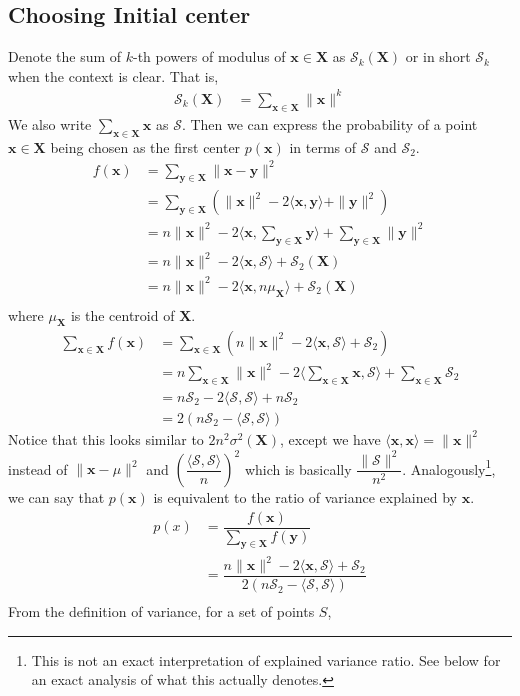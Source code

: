 \documentclass[twoside, 11pt]{article}
\newcommand{\x}{\mathbf{x}}
\newcommand{\X}{\mathbf{X}}
\newcommand{\y}{\mathbf{y}}
\renewcommand{\S}{\mathcal{S}}
\begin{document}
	\subsection{Choosing Initial center}
	Denote the sum of $k$-th powers of modulus of $\x\in\X$ as $\S_k(\X)$ or in short $\S_k$ when the context is clear. That is,
		\begin{align*}
			\S_k(\X) & = \sum_{\x\in\X}\|\x\|^k
		\end{align*}
	We also write $\sum_{\x\in\X}\x$ as $\S$. Then we can express the probability of a point $\x\in\X$ being chosen as the first center $p(\x)$ in terms of $\S$ and $\S_2$.
		\begin{align*}
			f(\x)	& = \sum_{\y\in\X}\|\x-\y\|^2\\
					& = \sum_{\y\in\X}\left(\|\x\|^2-2\langle\x,\y\rangle+\|\y\|^2\right)\\
					& = n\|\x\|^2-2\langle\x,\sum_{\y\in\X}\y\rangle+\sum_{\y\in\X}\|\y\|^2\\
					& = n\|\x\|^2-2\langle\x,\S\rangle+\S_2(\X)\\
					& = n\|\x\|^2-2\langle\x,n\mu_{\X}\rangle+\S_2(\X)\\
		\end{align*}
	where $\mu_{\X}$ is the centroid of $\X$.
		\begin{align*}
			\sum_{\x\in\X}f(\x)
					& = \sum_{\x\in\X}\left(n\|\x\|^2-2\langle\x,\S\rangle+\S_2\right)\\
					& = n\sum_{\x\in\X}\|\x\|^2-2\langle\sum_{\x\in\X}\x,\S\rangle+\sum_{\x\in\X}\S_2\\
					& = n\S_2-2\langle\S,\S\rangle+n\S_2\\
					& = 2(n\S_2-\langle\S,\S\rangle)
		\end{align*}
	Notice that this looks similar to $2n^2\sigma^2(\X)$, except we have $\langle \x,\x\rangle=\|\x\|^2$ instead of $\|\x-\mu\|^2$ and $\left(\dfrac{\langle\S,\S\rangle}{n}\right)^2$ which is basically $\dfrac{\|\S\|^2}{n^2}$. Analogously\footnote{This is not an exact interpretation of explained variance ratio. See below for an exact analysis of what this actually denotes.}, we can say that $p(\x)$ is equivalent to the ratio of variance explained by $\x$.
		\begin{align*}
			p(x) & = \dfrac{f(\x)}{\sum_{\y\in\X}f(\y)}\\
				 & = \dfrac{n\|\x\|^2-2\langle\x,\S\rangle+\S_2}{2(n\S_2-\langle\S,\S\rangle)}\\
		\end{align*}
	From the definition of variance, for a set of points $S$,
\end{document}
